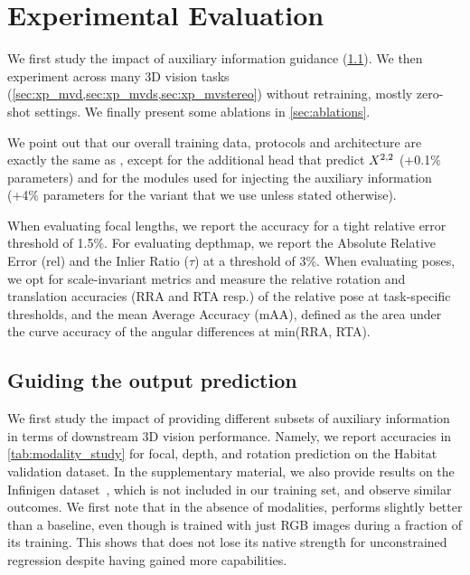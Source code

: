\section{Experimental Evaluation}
\label{sec:xps}







We first study the impact of auxiliary information guidance  (\cref{sec:xp_guiding}). 
We then experiment across many 3D vision tasks (\cref{sec:xp_mvd,sec:xp_mvds,sec:xp_mvstereo}) without retraining, \ie mostly zero-shot settings. We finally present some ablations in \cref{sec:ablations}.

We point out that our overall training data, protocols and architecture are exactly the same as \duster{}, except for the additional head that predict $X^{2,2}$ (+0.1\% parameters) and for the modules used for injecting the auxiliary information (+4\% parameters for the  variant that we use unless stated otherwise). 


When evaluating focal lengths, we report the accuracy for a tight relative error threshold of 1.5\%.
For evaluating depthmap, we report the Absolute Relative Error (rel) and the Inlier Ratio ($\tau$) at a threshold of 3\%.
When evaluating poses, we opt for scale-invariant metrics and measure the relative rotation and translation accuracies (RRA and RTA resp.) of the relative pose at task-specific thresholds, and the mean Average Accuracy (mAA), defined as the area under the curve accuracy of the angular differences at min(RRA, RTA). %




\subsection{Guiding the output prediction}
\label{sec:xp_guiding}

We first study the impact of providing different subsets of auxiliary information in terms of downstream 3D vision performance.
Namely, we report accuracies in \cref{tab:modality_study} for focal, depth, and rotation prediction on the Habitat validation dataset. %
In the supplementary material, we also provide results on the Infinigen dataset~\cite{Raistrick2023Infinigen}, which is not included in our training set, and observe similar outcomes.
We first note that in the absence of modalities, \ours{} performs slightly better than a \duster{} baseline, even though \ours{} is trained with just RGB images during a fraction of its training.
This shows that \ours{} does not lose its native strength for unconstrained regression despite having gained more capabilities.

